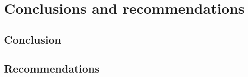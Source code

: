 \chapter{Conclusions and recommendations}
\label{cha:conclusions}
\section{Conclusion}
\section{Recommendations}